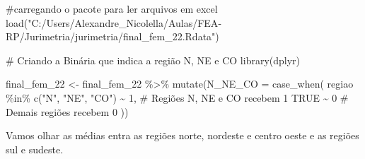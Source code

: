 \documentclass[
  letterpaper,
  DIV=11,
  numbers=noendperiod]{scrreprt}
\newenvironment{Shaded}{\begin{snugshade}}{\end{snugshade}}
\newcommand{\AttributeTok}[1]{\textcolor[rgb]{0.40,0.45,0.13}{#1}}
\newcommand{\CommentTok}[1]{\textcolor[rgb]{0.37,0.37,0.37}{#1}}
\newcommand{\ConstantTok}[1]{\textcolor[rgb]{0.56,0.35,0.01}{#1}}
\newcommand{\DecValTok}[1]{\textcolor[rgb]{0.68,0.00,0.00}{#1}}
\newcommand{\FunctionTok}[1]{\textcolor[rgb]{0.28,0.35,0.67}{#1}}
\newcommand{\NormalTok}[1]{\textcolor[rgb]{0.00,0.23,0.31}{#1}}
\newcommand{\OtherTok}[1]{\textcolor[rgb]{0.00,0.23,0.31}{#1}}
\newcommand{\SpecialCharTok}[1]{\textcolor[rgb]{0.37,0.37,0.37}{#1}}
\newcommand{\StringTok}[1]{\textcolor[rgb]{0.13,0.47,0.30}{#1}}
\begin{document}
\begin{Shaded}
\begin{Highlighting}[]
\CommentTok{\#carregando o pacote para ler arquivos em excel}
\FunctionTok{load}\NormalTok{(}\StringTok{"C:/Users/Alexandre\_Nicolella/Aulas/FEA{-}RP/Jurimetria/jurimetria/final\_fem\_22.Rdata"}\NormalTok{)}

\CommentTok{\# Criando a Binária que indica a região N, NE e CO}
\FunctionTok{library}\NormalTok{(dplyr)}

\NormalTok{final\_fem\_22 }\OtherTok{\textless{}{-}}\NormalTok{ final\_fem\_22 }\SpecialCharTok{\%\textgreater{}\%}
  \FunctionTok{mutate}\NormalTok{(}\AttributeTok{N\_NE\_CO =} \FunctionTok{case\_when}\NormalTok{(}
\NormalTok{    regiao }\SpecialCharTok{\%in\%} \FunctionTok{c}\NormalTok{(}\StringTok{"N"}\NormalTok{, }\StringTok{"NE"}\NormalTok{, }\StringTok{"CO"}\NormalTok{) }\SpecialCharTok{\textasciitilde{}} \DecValTok{1}\NormalTok{,  }\CommentTok{\# Regiões N, NE e CO recebem 1}
    \ConstantTok{TRUE} \SpecialCharTok{\textasciitilde{}} \DecValTok{0}                             \CommentTok{\# Demais regiões recebem 0}
\NormalTok{  ))}
\end{Highlighting}
\end{Shaded}

Vamos olhar as médias entra as regiões norte, nordeste e centro oeste e
as regiões sul e sudeste.

\begin{Shaded}
\end{Shaded}
\end{document}
